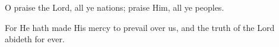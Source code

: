 O praise the Lord, all ye nations; praise Him, all ye peoples. 

For He hath made His mercy to prevail over us, and the truth of the Lord abideth for ever.
